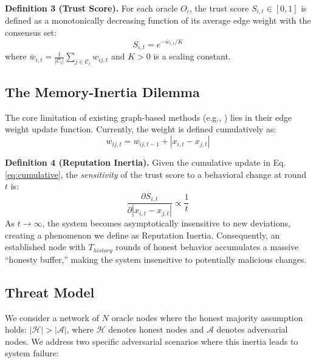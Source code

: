 \documentclass{ieeeaccess}
\begin{document}
\textbf{Definition 3 (Trust Score).} For each oracle $O_i$, the trust score $S_{i,t} \in [0, 1]$ is defined as a monotonically decreasing function of its average edge weight with the consensus set:
\begin{equation}
S_{i,t} = e^{-\bar{w}_{i,t}/K}
\label{eq:trust_score}
\end{equation}
where $\bar{w}_{i,t} = \frac{1}{|\mathcal{C}_t|} \sum_{j \in \mathcal{C}_t} w_{ij,t}$ and $K > 0$ is a scaling constant.

\subsection{The Memory-Inertia Dilemma}
The core limitation of existing graph-based methods (e.g., \cite{b7}) lies in their edge weight update function. Currently, the weight is defined cumulatively as:
\begin{equation}
w_{ij,t} = w_{ij,t-1} + |x_{i,t} - x_{j,t}|
\label{eq:cumulative}
\end{equation}

\textbf{Definition 4 (Reputation Inertia).} Given the cumulative update in Eq. \ref{eq:cumulative}, the \textit{sensitivity} of the trust score to a behavioral change at round $t$ is:
\begin{equation}
\frac{\partial S_{i,t}}{\partial |x_{i,t} - x_{j,t}|} \propto \frac{1}{t}
\label{eq:sensitivity}
\end{equation}
As $t \rightarrow \infty$, the system becomes asymptotically insensitive to new deviations, creating a phenomenon we define as Reputation Inertia. Consequently, an established node with $T_{history}$ rounds of honest behavior accumulates a massive ``honesty buffer,'' making the system insensitive to potentially malicious changes.

\subsection{Threat Model}
We consider a network of $N$ oracle nodes where the honest majority assumption holds: $|\mathcal{H}| > |\mathcal{A}|$, where $\mathcal{H}$ denotes honest nodes and $\mathcal{A}$ denotes adversarial nodes. We address two specific adversarial scenarios where this inertia leads to system failure:
\end{document}
